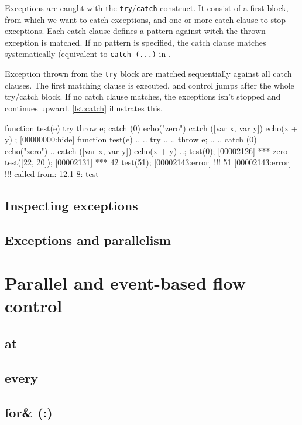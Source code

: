 Exceptions are caught with the \lstinline|try|/\lstinline|catch|
construct. It consist of a first block, from which we want to catch
exceptions, and one or more catch clause to stop exceptions. Each
catch clause defines a pattern against witch the thrown exception is
matched. If no pattern is specified, the catch clause matches
systematically (equivalent to \texttt{catch (...)} in \Cxx.

Exception thrown from the \texttt{try} block are matched sequentially
against all catch clauses. The first matching clause is executed, and
control jumps after the whole try/catch block. If no catch clause
matches, the exceptions isn't stopped and continues
upward. \autoref{lst:catch} illustrates this.

\begin{urbiscript}[caption=Catching exceptions, label=lst:catch,
  float=\floatpos]
function test(e)
{
  try
  { throw e;  }
  catch (0)
  { echo("zero") }
  catch ([var x, var y])
  { echo(x + y) }
};
[00000000:hide] function test(e)
..{
..  try
..  {
..    throw e;
..  }
..  catch (0) { echo("zero") }
..  catch ([var x, var y]) { echo(x + y) }
..};
test(0);
[00002126] *** zero
test([22, 20]);
[00002131] *** 42
test(51);
[00002143:error] !!! 51
[00002143:error] !!!    called from: 12.1-8: test

\end{urbiscript}

\subsection{Inspecting exceptions}

\subsection{Exceptions and parallelism}



\FloatBarrier
\section{Parallel and event-based flow control}

\subsection{at}
\subsection{every}
\subsection{for\& (:)}
